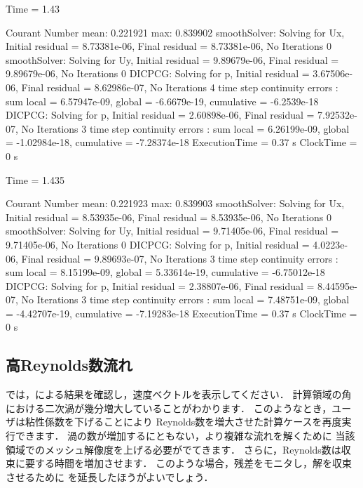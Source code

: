 \begin{OFverbatim}[file, linenum, weight=\scriptsize]
Time = 1.43

Courant Number mean: 0.221921 max: 0.839902
smoothSolver: Solving for Ux, Initial residual = 8.73381e-06, Final residual = 8.73381e-06, No Iterations 0
smoothSolver: Solving for Uy, Initial residual = 9.89679e-06, Final residual = 9.89679e-06, No Iterations 0
DICPCG: Solving for p, Initial residual = 3.67506e-06, Final residual = 8.62986e-07, No Iterations 4
time step continuity errors : sum local = 6.57947e-09, global = -6.6679e-19, cumulative = -6.2539e-18
DICPCG: Solving for p, Initial residual = 2.60898e-06, Final residual = 7.92532e-07, No Iterations 3
time step continuity errors : sum local = 6.26199e-09, global = -1.02984e-18, cumulative = -7.28374e-18
ExecutionTime = 0.37 s ClockTime = 0 s

Time = 1.435

Courant Number mean: 0.221923 max: 0.839903
smoothSolver: Solving for Ux, Initial residual = 8.53935e-06, Final residual = 8.53935e-06, No Iterations 0
smoothSolver: Solving for Uy, Initial residual = 9.71405e-06, Final residual = 9.71405e-06, No Iterations 0
DICPCG: Solving for p, Initial residual = 4.0223e-06, Final residual = 9.89693e-07, No Iterations 3
time step continuity errors : sum local = 8.15199e-09, global = 5.33614e-19, cumulative = -6.75012e-18
DICPCG: Solving for p, Initial residual = 2.38807e-06, Final residual = 8.44595e-07, No Iterations 3
time step continuity errors : sum local = 7.48751e-09, global = -4.42707e-19, cumulative = -7.19283e-18
ExecutionTime = 0.37 s ClockTime = 0 s
\end{OFverbatim}


\subsection{高Reynolds数流れ}
\label{ssec:2.1.8}
では，による結果を確認し，速度ベクトルを表示してください．
計算領域の角における二次渦が幾分増大していることがわかります．
このようなとき，ユーザは粘性係数を下げることにより
Reynolds数を増大させた計算ケースを再度実行できます．
渦の数が増加するにともない，より複雑な流れを解くために
当該領域でのメッシュ解像度を上げる必要がでてきます．
さらに，Reynolds数は収束に要する時間を増加させます．
このような場合，残差をモニタし，解を収束させるために
を延長したほうがよいでしょう．

